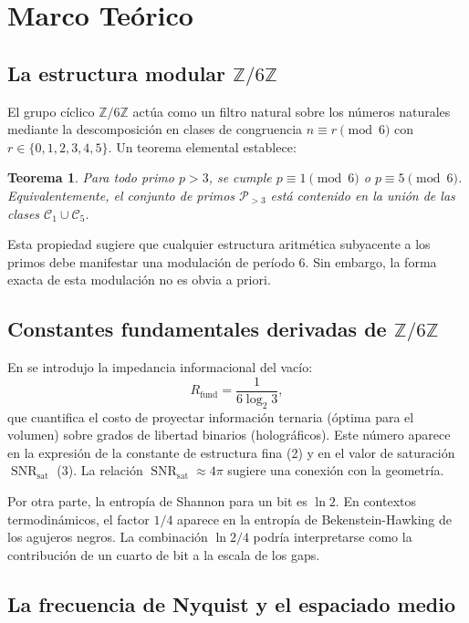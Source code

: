 \documentclass[12pt,a4paper]{article}
\theoremstyle{plain}
\newtheorem{teorema}{Teorema}[section]
\theoremstyle{definition}
\theoremstyle{remark}
\newcommand{\Zmod}{\mathbb{Z}/6\mathbb{Z}}
\newcommand{\SNR}{\operatorname{SNR}}
\newcommand{\Rfund}{R_{\text{fund}}}
\newcommand{\SNRsat}{\SNR_{\text{sat}}}
\begin{document}
\section{Marco Teórico}

\subsection{La estructura modular $\Zmod$}

El grupo cíclico $\Zmod$ actúa como un filtro natural sobre los números naturales mediante la descomposición en clases de congruencia $n \equiv r \pmod{6}$ con $r \in \{0,1,2,3,4,5\}$. Un teorema elemental establece:

\begin{teorema}
Para todo primo $p > 3$, se cumple $p \equiv 1 \pmod{6}$ o $p \equiv 5 \pmod{6}$. Equivalentemente, el conjunto de primos $\mathcal{P}_{>3}$ está contenido en la unión de las clases $\mathcal{C}_1 \cup \mathcal{C}_5$.
\end{teorema}

Esta propiedad sugiere que cualquier estructura aritmética subyacente a los primos debe manifestar una modulación de período 6. Sin embargo, la forma exacta de esta modulación no es obvia a priori.

\subsection{Constantes fundamentales derivadas de $\Zmod$}

En \cite{PeinadorGenesis} se introdujo la impedancia informacional del vacío:
\begin{equation}
\Rfund = \frac{1}{6\log_2 3},
\end{equation}
que cuantifica el costo de proyectar información ternaria (óptima para el volumen) sobre grados de libertad binarios (holográficos). Este número aparece en la expresión de la constante de estructura fina (2) y en el valor de saturación $\SNRsat$ (3). La relación $\SNRsat \approx 4\pi$ sugiere una conexión con la geometría.

Por otra parte, la entropía de Shannon para un bit es $\ln 2$. En contextos termodinámicos, el factor $1/4$ aparece en la entropía de Bekenstein-Hawking de los agujeros negros. La combinación $\ln 2/4$ podría interpretarse como la contribución de un cuarto de bit a la escala de los gaps.

\subsection{La frecuencia de Nyquist y el espaciado medio}
\end{document}
